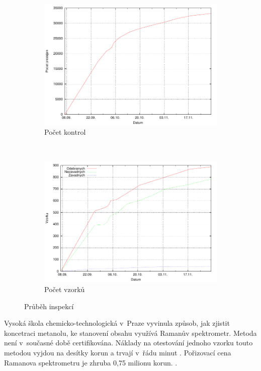 \documentclass[11pt,a4paper]{article}
\begin{document}
\begin{figure}[h!]
  \centering
  \begin{subfigure}[t]{0.5\textwidth}
    \centering
    \includegraphics[width=\textwidth]{kontrol}
    \caption{Počet kontrol}
    \label{kontrol}
  \end{subfigure}%
  ~ %
  \begin{subfigure}[t]{0.5\textwidth}
    \centering
    \includegraphics[width=\textwidth]{vzorky}
    \caption{Počet vzorků}
    \label{vzorky}
  \end{subfigure}
  \caption{Průběh inspekcí}
\end{figure}

Vysoká škola chemicko-technologická v~Praze vyvinula způsob, jak zjistit
koncetraci metanolu, ke stanovení obsahu využívá Ramanův spektrometr. Metoda není 
v~současné době certifikována. Náklady na otestování jednoho vzorku touto metodou vyjdou 
na desítky korun a trvají v~řádu minut \cite{raman1,raman2}. Pořizovací cena Ramanova spektrometru 
je zhruba 0,75 milionu korun. \cite{rcen}. 
\end{document}
